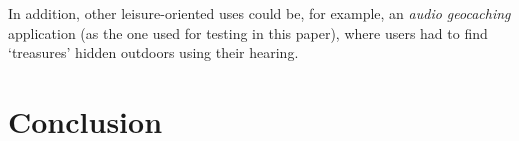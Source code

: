 \documentclass[journal]{IEEEtran}
\begin{document}
In addition, other leisure-oriented uses could be, for example, an \textit{audio geocaching} application (as the one used for testing in this paper), where users had to find `treasures' hidden outdoors using their hearing.


%
%







\section{Conclusion}
\end{document}
